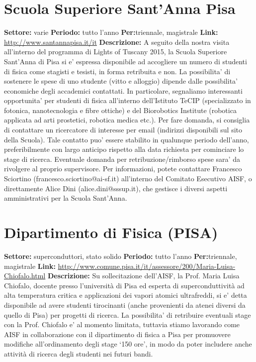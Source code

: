 \documentclass[a4paper,10pt]{article}
\begin{document}
{\section{ Scuola Superiore Sant'Anna Pisa }
\textbf{Settore:} varie\newline
\textbf{Periodo:} tutto l'anno\newline
\textbf{Per:}triennale, magistrale\newline
\textbf{Link:} \url{http://www.santannapisa.it/it} \newline
\textbf{Descrizione:}   A seguito della nostra 
visita all'interno del programma di Lights of Tuscany 2015, la Scuola Superiore Sant'Anna di Pisa si e' espressa disponibile ad accogliere un numero di studenti di fisica come stagisti e tesisti, in 
 forma retribuita e non. La possibilita' di sostenere le spese di uno studente (vitto e alloggio) dipende dalle possibilita' economiche degli accademici contattati. In particolare, segnaliamo 
 interessanti opportunita' per studenti di fisica all'interno dell'Istituto TeCIP (specializzato in fotonica, nanotecnologia e fibre ottiche) e del Biorobotics Institute (robotica applicata ad arti 
 prostetici, robotica medica etc.). Per fare domanda, si consiglia di contattare un ricercatore di interesse per email (indirizzi disponibili sul sito della Scuola). Tale contatto puo' essere stabilito 
 in qualunque periodo dell'anno, preferibilmente con largo anticipo rispetto alla data richiesta per cominciare lo stage di ricerca. Eventuale domanda per retribuzione/rimborso spese sara' da rivolgere 
 al proprio supervisore. Per informazioni, potete contattare Francesco Sciortino (francesco.sciortino@ai-sf.it) all'interno del Comitato Esecutivo AISF, o direttamente Alice Dini (alice.dini@sssup.it), 
 che gestisce i diversi aspetti amministrativi per la Scuola Sant'Anna.  

 \section{ Dipartimento di Fisica (PISA) }
 \textbf{Settore:} superconduttori, stato solido\newline
\textbf{Periodo:} tutto l'anno\newline
\textbf{Per:}triennale, magistrale\newline
\textbf{Link:} \url{http://www.comune.pisa.it/it/assessore/200/Maria-Luisa-Chiofalo.html} \newline
\textbf{Descrizione:}  Su sollecitazione dell'AISF, la Prof. Maria Luisa Chiofalo, docente presso l’università di Pisa ed esperta di superconduttività ad alta temperatura critica 
 e applicazioni dei vapori atomici ultrafreddi, si e’ detta disponibile ad avere studenti tirocinanti (anche provenienti da atenei diversi da quello di Pisa) per progetti di ricerca. La possibilita’ di 
 retribuire eventuali stage con la Prof. Chiofalo e’ al momento limitata, tuttavia stiamo lavorando come AISF in collaborazione con il dipartimento di fisica a Pisa per promuovere modifiche 
 all’ordinamento degli stage ‘150 ore’, in modo da poter includere anche attività di ricerca degli studenti nei futuri bandi.  

}
\end{document}
